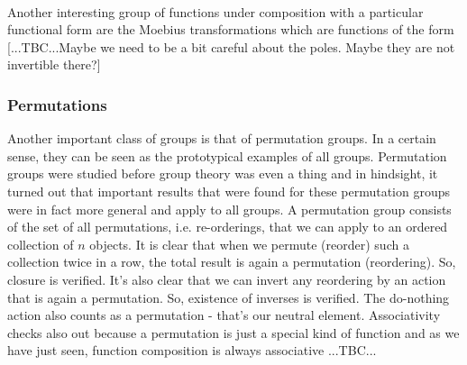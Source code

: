 \paragraph{} Another interesting group of functions under composition with a particular functional form are the Moebius transformations which are functions of the form [...TBC...Maybe we need to be a bit careful about the poles. Maybe they are not invertible there?]



\subsubsection{Permutations}
Another important class of groups is that of permutation groups. In a certain sense, they can be seen as the prototypical examples of all groups. Permutation groups were studied before group theory was even a thing and in hindsight, it turned out that important results that were found for these permutation groups were in fact more general and apply to all groups. A permutation group consists of the set of all permutations, i.e. re-orderings, that we can apply to an ordered collection of $n$ objects. It is clear that when we permute (reorder) such a collection twice in a row, the total result is again a permutation (reordering). So, closure is verified. It's also clear that we can invert any reordering by an action that is again a permutation. So, existence of inverses is verified. The do-nothing action also counts as a permutation - that's our neutral element. Associativity checks also out because a permutation is just a special kind of function and as we have just seen, function composition is always associative ...TBC...

